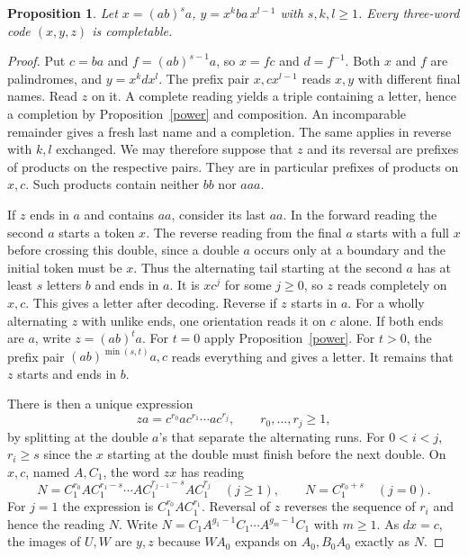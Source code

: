 \documentclass[11pt,a4paper]{article}
\newtheorem{prop}[lemma]{Proposition}
\begin{document}
\begin{prop}\label{altern}
Let $x=(ab)^s a$, $y=x^k ba\,x^{l-1}$ with $s,k,l\ge1$. Every three-word code $(x,y,z)$ is completable.
\end{prop}
\begin{proof}
Put $c=ba$ and $f=(ab)^{s-1}a$, so $x=fc$ and $d=f^{-1}$. Both $x$ and $f$ are palindromes, and $y=x^k d x^l$. The prefix pair $x,cx^{l-1}$ reads $x,y$ with different final names. Read $z$ on it. A complete reading yields a triple containing a letter, hence a completion by Proposition~\ref{power} and composition. An incomparable remainder gives a fresh last name and a completion. The same applies in reverse with $k,l$ exchanged. We may therefore suppose that $z$ and its reversal are prefixes of products on the respective pairs. They are in particular prefixes of products on $x,c$. Such products contain neither $bb$ nor $aaa$.

If $z$ ends in $a$ and contains $aa$, consider its last $aa$. In the forward reading the second $a$ starts a token $x$. The reverse reading from the final $a$ starts with a full $x$ before crossing this double, since a double $a$ occurs only at a boundary and the initial token must be $x$. Thus the alternating tail starting at the second $a$ has at least $s$ letters $b$ and ends in $a$. It is $xc^j$ for some $j\ge0$, so $z$ reads completely on $x,c$. This gives a letter after decoding. Reverse if $z$ starts in $a$. For a wholly alternating $z$ with unlike ends, one orientation reads it on $c$ alone. If both ends are $a$, write $z=(ab)^t a$. For $t=0$ apply Proposition~\ref{power}. For $t>0$, the prefix pair $(ab)^{\min(s,t)}a,c$ reads everything and gives a letter. It remains that $z$ starts and ends in $b$.

There is then a unique expression
\[
 za=c^{r_0}a c^{r_1}\cdots a c^{r_j},\qquad r_0,\ldots,r_j\ge1 ,
\]
by splitting at the double $a$'s that separate the alternating runs. For $0<i<j$, $r_i\ge s$ since the $x$ starting at the double must finish before the next double. On $x,c$, named $A,C_1$, the word $zx$ has reading
\[
 N=C_1^{r_0} A C_1^{r_1-s}\cdots A C_1^{r_{j-1}-s} A C_1^{r_j}
 \quad(j\ge1),\qquad N=C_1^{r_0+s}\quad(j=0).
\]
For $j=1$ the expression is $C_1^{r_0} A C_1^{r_1}$. Reversal of $z$ reverses the sequence of $r_i$ and hence the reading $N$. Write $N=C_1 A^{g_1-1}C_1\cdots A^{g_m-1} C_1$ with $m\ge1$. As $dx=c$, the images of $U,W$ are $y,z$ because $WA_0$ expands on $A_0,B_0 A_0$ exactly as $N$.


\end{proof}
\end{document}
